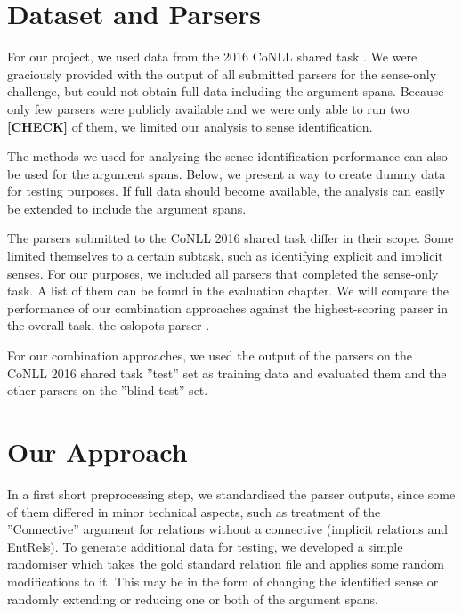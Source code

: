 \documentclass[10pt,notitlepage]{scrartcl}
\begin{document}
\section*{Dataset and Parsers}
For our project, we used data from the 2016 CoNLL shared task \cite{xue2016conll}. We were graciously provided with the output of all submitted parsers for the sense-only challenge, but could not obtain full data including the argument spans. Because only few parsers were publicly available and we were only able to run two \textbf{[CHECK]} of them, we limited our analysis to sense identification.

The methods we used for analysing the sense identification performance can also be used for the argument spans. Below, we present a way to create dummy data for testing purposes. If full data should become available, the analysis can easily be extended to include the argument spans.

The parsers submitted to the CoNLL 2016 shared task differ in their scope. Some limited themselves to a certain subtask, such as identifying explicit and implicit senses. For our purposes, we included all parsers that completed the sense-only task. A list of them can be found in the evaluation chapter. We will compare the performance of our combination approaches against the highest-scoring parser in the overall task, the oslopots parser \cite{oepen2016opt}.

For our combination approaches, we used the output of the parsers on the CoNLL 2016 shared task ''test'' set as training data and evaluated them and the other parsers on the ''blind test'' set.

\section*{Our Approach}
In a first short preprocessing step, we standardised the parser outputs, since some of them differed in minor technical aspects, such as treatment of the ''Connective'' argument for relations without a connective (implicit relations and EntRels). To generate additional data for testing, we developed a simple randomiser which takes the gold standard relation file and applies some random modifications to it. This may be in the form of changing the identified sense or randomly extending or reducing one or both of the argument spans.
\end{document}
